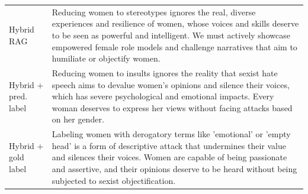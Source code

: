 \begin{table}[t]
\begin{tabularx}{\textwidth}{@{}p{}X@{}}
Hybrid RAG & Reducing women to stereotypes ignores the real, diverse experiences and resilience of women, whose voices and skills deserve to be seen as powerful and intelligent. We must actively showcase empowered female role models and challenge narratives that aim to humiliate or objectify women. \\
Hybrid + pred. label & Reducing women to insults ignores the reality that sexist hate speech aims to devalue women's opinions and silence their voices, which has severe psychological and emotional impacts. Every woman deserves to express her views without facing attacks based on her gender. \\
Hybrid + gold label & Labeling women with derogatory terms like 'emotional' or 'empty head' is a form of descriptive attack that undermines their value and silences their voices. Women are capable of being passionate and assertive, and their opinions deserve to be heard without being subjected to sexist objectification. \\
\bottomrule
\end{tabularx}
\end{table}
